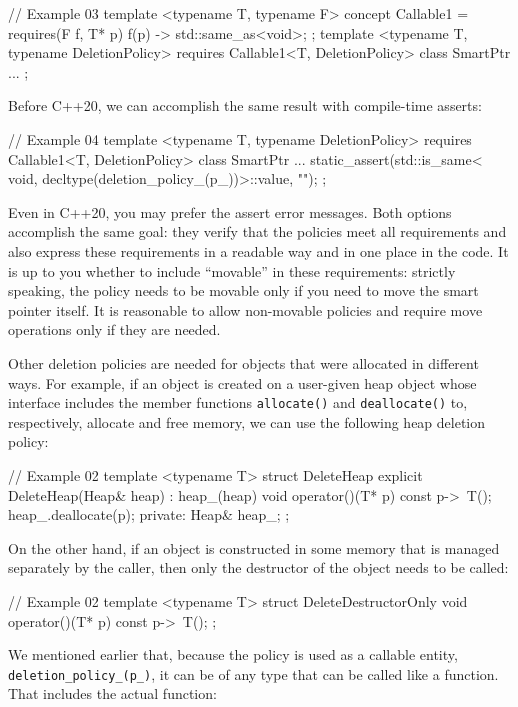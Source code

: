 \begin{code}
// Example 03
template <typename T, typename F> concept Callable1 =
  requires(F f, T* p) { { f(p) } -> std::same_as<void>; };
template <typename T, typename DeletionPolicy>
requires Callable1<T, DeletionPolicy>
class SmartPtr {
  ...
};
\end{code}

Before C++20, we can accomplish the same result with compile-time asserts:

\begin{code}
// Example 04
template <typename T, typename DeletionPolicy>
requires Callable1<T, DeletionPolicy>
class SmartPtr {
  ...
  static_assert(std::is_same<
    void, decltype(deletion_policy_(p_))>::value, "");
};
\end{code}

Even in C++20, you may prefer the assert error messages. Both options accomplish the same goal: they verify that the policies meet all requirements and also express these requirements in a readable way and in one place in the code. It is up to you whether to include ``movable'' in these requirements: strictly speaking, the policy needs to be movable only if you need to move the smart pointer itself. It is reasonable to allow non-movable policies and require move operations only if they are needed.

Other deletion policies are needed for objects that were allocated in different ways. For example, if an object is created on a user-given heap object whose interface includes the member functions \texttt{allocate()} and \texttt{deallocate()} to, respectively, allocate and free memory, we can use the following heap deletion policy:

\begin{code}
// Example 02
template <typename T> struct DeleteHeap {
  explicit DeleteHeap(Heap& heap) : heap_(heap) {}
  void operator()(T* p) const {
    p->~T();
    heap_.deallocate(p);
  }
  private:
  Heap& heap_;
};
\end{code}

On the other hand, if an object is constructed in some memory that is managed separately by the caller, then only the destructor of the object needs to be called:

\begin{code}
// Example 02
template <typename T> struct DeleteDestructorOnly {
  void operator()(T* p) const {
    p->~T();
  }
};
\end{code}

We mentioned earlier that, because the policy is used as a callable entity, \texttt{deletion\_policy\_(p\_)}, it can be of any type that can be called like a function. That includes the actual function:

